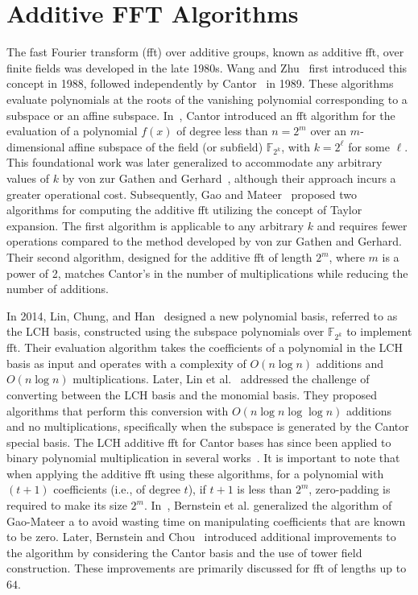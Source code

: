 \section{Additive FFT Algorithms}\label{sec:lit_additive_fft}
The fast Fourier transform (\gls{fft}) over additive groups, known as additive \gls{fft}, over finite fields was developed in the late 1980s. Wang and Zhu~\cite{WangZhu1988} first introduced this concept in 1988, followed independently by Cantor~\cite{Cantor1989FFT} in 1989. These algorithms evaluate polynomials at the roots of the vanishing polynomial corresponding to a subspace or an affine subspace. In~\cite{Cantor1989FFT}, Cantor introduced an \gls{fft} algorithm for the evaluation of a polynomial $f(x)$ of degree less than $n = 2^m$ over an $m$-dimensional affine subspace of the field (or subfield) $\mathbb{F}_{2^k}$, with $k = 2^\ell$ for some $\ell$. This foundational work was later generalized to accommodate any arbitrary values of $k$ by von zur Gathen and Gerhard~\cite{zurGathenFFT}, although their approach incurs a greater operational cost. Subsequently, Gao and Mateer~\cite{Gao2010FFT} proposed two algorithms for computing the additive \gls{fft} utilizing the concept of Taylor expansion. The first algorithm is applicable to any arbitrary $k$ and requires fewer operations compared to the method developed by von zur Gathen and Gerhard. Their second algorithm, designed for the additive \gls{fft} of length $2^m$, where $m$ is a power of 2, matches Cantor’s in the number of multiplications while reducing the number of additions. 


In 2014, Lin, Chung, and Han~\cite{LCH-basis2014} designed a new polynomial basis, referred to as the LCH basis, constructed using the subspace polynomials over $\mathbb{F}_{2^k}$ to implement \gls{fft}. Their evaluation algorithm takes the coefficients of a polynomial in the LCH basis as input and operates with a complexity of $O(n \log n)$ additions and $O(n \log n)$ multiplications. Later, Lin et al.~\cite{LCH-conv2016} addressed the challenge of converting between the LCH basis and the monomial basis. They proposed algorithms that perform this conversion with $O(n \log n \log \log n)$ additions and no multiplications, specifically when the subspace is generated by the Cantor special basis. The LCH additive \gls{fft} for Cantor bases has since been applied to binary polynomial multiplication in several works~\cite{LCH-Fast_Mult2018,LCH-Frobenius2018}. It is important to note that when applying the additive \gls{fft} using these algorithms, for a polynomial with $(t+1)$ coefficients (i.e., of degree $t$), if $t+1$ is less than $2^m$, zero-padding is required to make its size $2^m$. In~\cite{BernsteinChouSchwabe2013}, Bernstein et al. generalized the algorithm of Gao-Mateer a to avoid wasting time on manipulating coefficients that are known to be zero. Later, Bernstein and Chou~\cite{BernsteinChou2014} introduced additional improvements to the algorithm by considering the Cantor basis and the use of tower field construction. These improvements are primarily discussed for \gls{fft} of lengths up to $64$.




